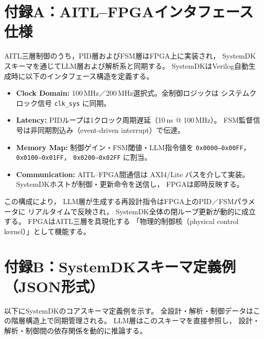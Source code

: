 \appendix
\section*{付録A：AITL–FPGAインタフェース仕様}

AITL三層制御のうち，PID層およびFSM層はFPGA上に実装され，
SystemDKスキーマを通じてLLM層および解析系と同期する。
SystemDKはVerilog自動生成時に以下のインタフェース構造を定義する。

\begin{itemize}
  \setlength{\itemsep}{1pt}
  \item \textbf{Clock Domain:} 100\,MHz／200\,MHz選択式。全制御ロジックは
        システムクロック信号 \texttt{clk\_sys} に同期。
  \item \textbf{Latency:} PIDループは1クロック周期遅延（10\,ns @ 100\,MHz）。
        FSM監督信号は非同期割込み（event-driven interrupt）で伝達。
  \item \textbf{Memory Map:} 制御ゲイン・FSM閾値・LLM指令値を
        \texttt{0x0000--0x00FF}，
        \texttt{0x0100--0x01FF}，
        \texttt{0x0200--0x02FF} に割当。
  \item \textbf{Communication:} AITL--FPGA間通信は
        AXI4\-/Lite バスを介して実装。
        SystemDKホストが制御・更新命令を送信し，
        FPGAは即時反映する。
\end{itemize}

この構成により，
LLM層が生成する再設計指令はFPGA上のPID／FSMパラメータに
リアルタイムで反映され，
SystemDK全体の閉ループ更新が動的に成立する。
FPGAはAITL三層を具現化する
「物理的制御核（physical control kernel）」として機能する。

\section*{付録B：SystemDKスキーマ定義例（JSON形式）}

以下にSystemDKのコアスキーマ定義例を示す。
全設計・解析・制御データはこの階層構造上で同期管理される。
LLM層はこのスキーマを直接参照し，
設計・解析・制御間の依存関係を動的に推論する。


